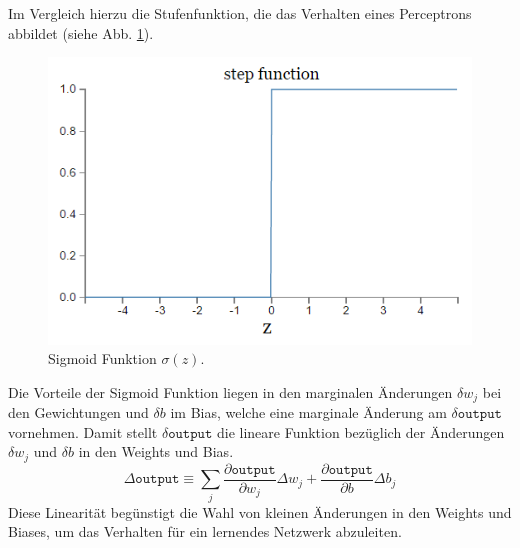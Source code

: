 \noindent
Im Vergleich hierzu die Stufenfunktion, die das Verhalten eines Perceptrons abbildet (siehe Abb. \ref{fig:perceptron_plot}).
\begin{figure}[hbt]
	\centering
	\includegraphics[scale=0.6]{Bilder/perceptron_plot}
	\caption{Sigmoid Funktion $\sigma(z)$.} 
	\label{fig:perceptron_plot} 
\end{figure}
Die Vorteile der Sigmoid Funktion liegen in den marginalen Änderungen $\delta w_j$ bei den Gewichtungen und $\delta b$ im Bias, welche eine marginale Änderung am $\delta\mathtt{output}$ vornehmen. Damit stellt $\delta\mathtt{output}$ die lineare Funktion bezüglich der Änderungen  $\delta w_j$ und $\delta b$ in den Weights und Bias.
\begin{equation}
	\Delta\mathtt{output} \equiv \sum_{j}{\frac{\partial\mathtt{output}}{\partial w_j}\Delta w_j+\frac{\partial\mathtt{output}}{\partial b}\Delta b_j}
\end{equation}
Diese Linearität begünstigt die Wahl von kleinen Änderungen in den Weights und Biases, um das Verhalten für ein lernendes Netzwerk abzuleiten.   